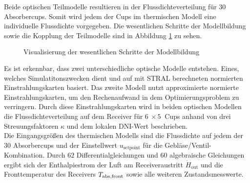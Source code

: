 Beide optischen Teilmodelle resultieren in der Flussdichteverteilung für $30$ Absorbercups.
Somit wird jedem der Cups im thermischen Modell eine individuelle Flussdichte vorgegeben.
Die wesentlichen Schritte der Modellbildung sowie die Kopplung der Teilmodelle sind in Abbildung \ref{fig_ZusammenfassungKopplung} zu sehen.

\begin{figure}[p]
    \centering
    \setlength{\fboxsep}{1pt}
    \setlength{\fboxrule}{1pt}
    \caption[Visualisierung der wesentlichen Schritte der Modellbildung]{Visualisierung der wesentlichen Schritte der Modellbildung}
    \label{fig_ZusammenfassungKopplung}
\end{figure}

Es ist erkennbar, dass zwei unterschiedliche optische Modelle entstehen.
Eines, welches Simulatitonszwecken dient und auf mit STRAL berechneten normierten Einstrahlungskarten basiert.
Das zweite Modell nutzt approximierte normierte Einstrahlungskarten, um den Rechenaufwand in dem Optimierungsproblem zu verringern.
Durch diese Einstrahlungskarten wird in beiden optischen Modellen die Flussdichteverteilung auf dem Receiver für $\SI{6}{} \times \SI{5}{}$ Cups anhand von drei Streuungsfaktoren $\kappa$ und dem lokalen DNI-Wert beschrieben.\\
Die Eingangsgrößen des thermischen Modells sind die Flussdichte auf jedem der 30 Absorbercups und der Einstellwert $u_{\mathrm{setpoint}}$ für die Gebläse/Ventil-Kombination.
Durch $62$ Differentialgleichungen und $60$ algebraische Gleichungen ergibt sich der Enthalpiestrom der Luft am Receiveraustritt $\dot{H}_{\mathrm{out}}$ und die Fronttemperatur des Receivers $T_{\mathrm{abs,front}}$ sowie alle weiteren Zustandsmesswerte.

